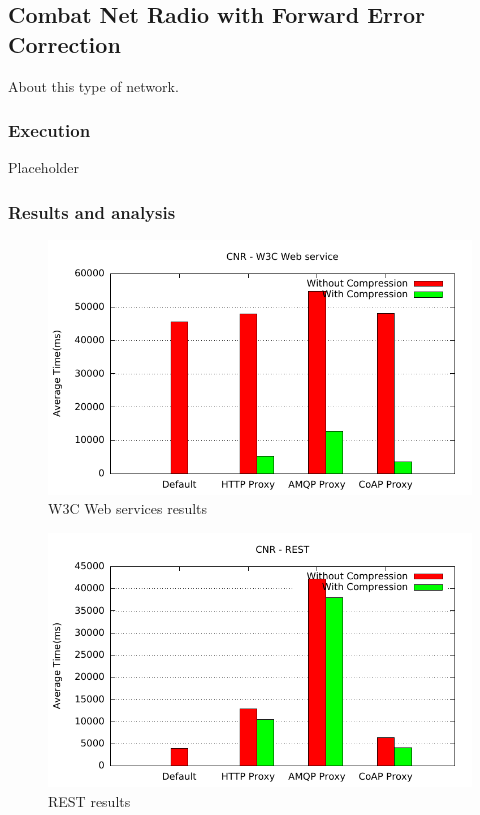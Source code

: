 \subsection{Combat Net Radio with Forward Error Correction}

About this type of network.

\subsubsection{Execution}
Placeholder

\subsubsection{Results and analysis}

\begin{figure}[H]
\center
\includegraphics[scale=0.75]{../results/cnr/nffi/out.pdf}
\caption{W3C Web services results}
\end{figure}

\begin{figure}[H]
\center
\includegraphics[scale=0.75]{../results/cnr/rest/out.pdf}
\caption{REST results}
\end{figure}


